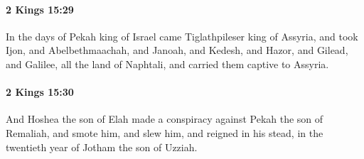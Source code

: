		\paragraph{2 Kings 15:29} %
			\label{2KINGS-15-29}

			In the days of Pekah king of Israel came Tiglathpileser king of Assyria, and took Ijon, and Abelbethmaachah, and Janoah, and Kedesh, and Hazor, and Gilead, and Galilee, all the land of Naphtali, and carried them captive to Assyria.


		\paragraph{2 Kings 15:30} %
			\label{2KINGS-15-30}

			And Hoshea the son of Elah made a conspiracy against Pekah the son of Remaliah, and smote him, and slew him, and reigned in his stead, in the twentieth year of Jotham the son of Uzziah.

